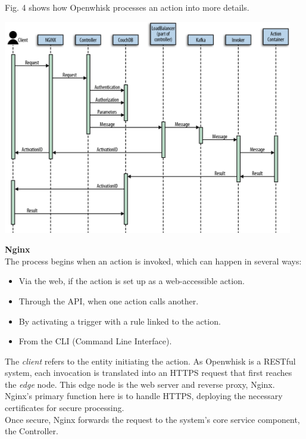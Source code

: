 Fig. 4 shows how Openwhisk processes an action into more details.\cite{sciabarra2019learning}\vspace{10pt}
\begin{center}
    \includegraphics[width=0.95\textwidth]{img/sequence.png}
    \vspace{10pt}
\end{center}
\textbf{Nginx}\\
The process begins when an action is invoked, which can happen in several ways:
\begin{itemize}
    \item Via the web, if the action is set up as a web-accessible action.
    \item Through the API, when one action calls another.
    \item By activating a trigger with a rule linked to the action.
    \item From the CLI (Command Line Interface).
\end{itemize}
The \textit{client} refers to the entity initiating the action. As Openwhisk is a RESTful system, each invocation is translated into an HTTPS request that first reaches the \textit{edge} node. This edge node is the web server and reverse proxy, Nginx.\\
Nginx’s primary function here is to handle HTTPS, deploying the necessary certificates for secure processing.\\
Once secure, Nginx forwards the request to the system's core service component, the Controller.\vspace{70pt}\\
